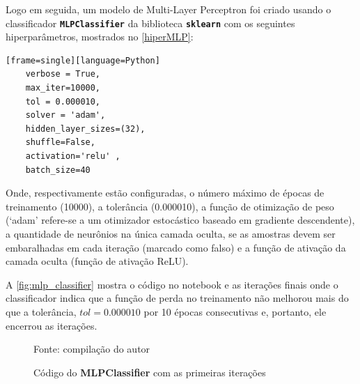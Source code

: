 Logo em seguida, um modelo de Multi-Layer Perceptron foi criado usando o classificador \texttt{\textbf{MLPClassifier}} da biblioteca \texttt{\textbf{sklearn}} com os seguintes hiperparâmetros, mostrados no \autoref{hiperMLP}: 
\begin{lstlisting}[caption={Hiperparâmetros do MLPClassifier},label=hiperMLP][frame=single][language=Python]
	verbose = True,
	max_iter=10000,
	tol = 0.000010,
	solver = 'adam',
	hidden_layer_sizes=(32),
	shuffle=False,
	activation='relu' ,
	batch_size=40
\end{lstlisting}


Onde, respectivamente estão configuradas, o número máximo de épocas de treinamento (10000), a tolerância (0.000010), a função de otimização de peso (`adam' refere-se a um otimizador estocástico baseado em gradiente descendente), a quantidade de neurônios na única camada oculta, se as amostras devem ser embaralhadas em cada iteração (marcado como falso) e a função de ativação da camada oculta (função de ativação ReLU).

A \autoref{fig:mlp_classifier} mostra o código no notebook e as iterações finais onde o classificador indica que a função de perda no treinamento não melhorou mais do que a tolerância, $tol = 0.000010$ por 10 épocas consecutivas e, portanto, ele encerrou as iterações.

\begin{figure}[h]
	\centering
	\caption{Código do \textbf{MLPClassifier} com as primeiras iterações}
	
	\label{fig:mlp_classifier}
	{\scriptsize Fonte: compilação do autor}
\end{figure}


